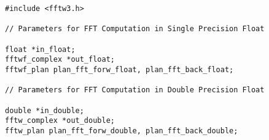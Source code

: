 \lstset{framesep=-10pt, xleftmargin=-10pt}
\begin{lstlisting}[caption={FHEW: FFT datatypes},label={listing:3.8.2}]
#include <fftw3.h>

// Parameters for FFT Computation in Single Precision Float

float *in_float;
fftwf_complex *out_float;
fftwf_plan plan_fft_forw_float, plan_fft_back_float;

// Parameters for FFT Computation in Double Precision Float

double *in_double;
fftw_complex *out_double;
fftw_plan plan_fft_forw_double, plan_fft_back_double;
\end{lstlisting}



